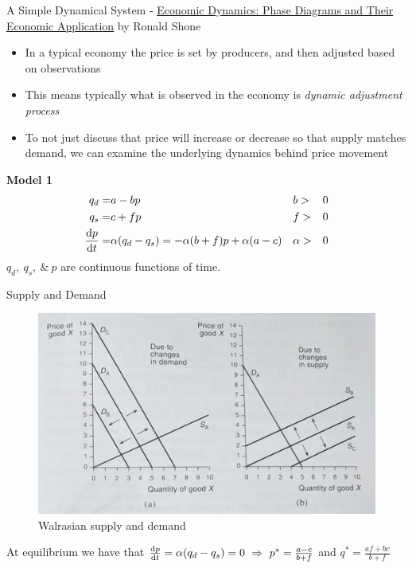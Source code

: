 \documentclass{article}
\begin{document}
	A Simple Dynamical System - \underline{Economic Dynamics: Phase Diagrams and Their Economic Application} by Ronald Shone
	\begin{itemize}
		\item In a typical economy the price is set by producers, and then adjusted based on observations
		\item This means typically what is observed in the economy is \emph{dynamic adjustment process}
		\item To not just discuss that price will increase or decrease so that supply matches demand, we can examine the underlying dynamics behind price movement
	\end{itemize}
	
	\textbf{Model 1}
	\begin{align*}
		q_d =& a - bp && b >& 0\\ %
		q_s =& c + fp && f >& 0 \\ %
		\frac{\d p}{\d t} =& \alpha(q_d - q_s) = -\alpha(b+f)p + \alpha(a-c) && \alpha >& 0
	\end{align*}
	$q_d,\ q_s,\ \&\ p$ are continuous functions of time.

Supply and Demand
	\begin{figure}
		\centering
			\includegraphics{Figures/SnD.png}
		\caption{Walrasian supply and demand}
	\end{figure}
	
	At equilibrium we have that $\frac{\mathrm{d} p}{\mathrm{d} t} = \alpha(q_d - q_s) = 0 \ \Rightarrow \ p^* = \frac{a-c}{b+f}$ and $q^* = \frac{af + bc}{b+f}$
\end{document}
